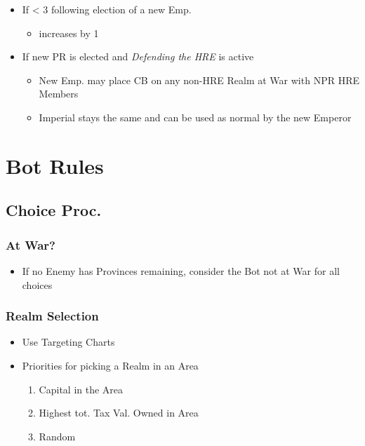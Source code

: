 \documentclass[10pt]{article}
\begin{document}
\begin{itemize}
	\item If \authority < 3 following election of a new Emp.
	\begin{itemize}
		\item \authority increases by 1
	\end{itemize}
	\item If new PR is elected and \emph{Defending the HRE} is active
	\begin{itemize}
		\item New Emp. may place CB on any non-HRE Realm at War with NPR HRE Members
		\item Imperial \manpower stays the same and can be used as normal by the new Emperor
	\end{itemize}
\end{itemize}


\botrules %
\section*{Bot Rules}
\subsection*{Choice Proc. }

\subsubsection*{At War?}
\begin{itemize}
	\item If no Enemy has Provinces remaining, consider the Bot not at War for all choices
\end{itemize}

\subsubsection*{Realm Selection}
\begin{itemize}
	\item Use Targeting Charts
	\item Priorities for picking a Realm in an Area
	\begin{enumerate}
		\item Capital in the Area
		\item Highest tot. Tax Val. Owned in Area
		\item Random
	\end{enumerate}
\end{itemize}
\end{document}
